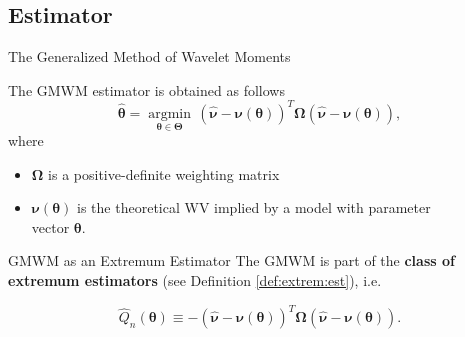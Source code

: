 \documentclass[envcountsect,usenames,dvipsnames]{beamer}
\DeclareMathOperator*{\argmin}{argmin}
\theoremstyle{mystyle}
\begin{document}


\subsection{Estimator}

\begin{frame}{The Generalized Method of Wavelet Moments}

\begin{Definition}
	\small
The GMWM estimator is obtained as follows
\begin{equation*}
        \hat{\bm{\theta}} = \underset{\bm{\theta} \in \bm{\Theta}}{\argmin} \, (\hat{\bm{\nu}} - \bm{\nu}(\bm{\theta}))^T\bm{\Omega}(\hat{\bm{\nu}} - \bm{\nu}(\bm{\theta})),
\end{equation*}
where
\begin{itemize}
    \item $\bm{\Omega}$ is a positive-definite weighting matrix
    \item $\bm{\nu}(\bm{\theta})$ is the theoretical WV implied by a model with parameter\\ vector $\bm{\theta}$.
\end{itemize}
\end{Definition}

\begin{alertblock}{GMWM as an Extremum Estimator}
		\small
The GMWM is part of the \textbf{class of extremum estimators} (see Definition \ref{def:extrem:est}), i.e.

\begin{equation*}
        \hat{Q}_n(\bm{\theta}) \equiv -(\hat{\bm{\nu}} - \bm{\nu}(\bm{\theta}))^T\bm{\Omega}(\hat{\bm{\nu}} - \bm{\nu}(\bm{\theta})).
\end{equation*}
\end{alertblock}

\end{frame}
\end{document}
